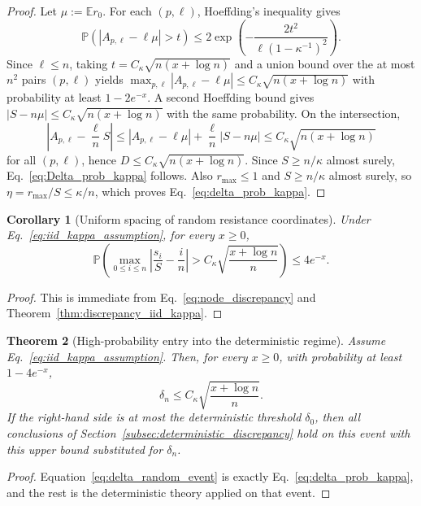 \documentclass[11pt]{article}
\numberwithin{equation}{section}
\newtheorem{theorem}{Theorem}[section]
\newtheorem{corollary}[theorem]{Corollary}
\theoremstyle{definition}
\theoremstyle{remark}
\newcommand{\E}{\mathbb{E}}
\newcommand{\Prob}{\mathbb{P}}
\begin{document}
\begin{proof}
	Let $\mu:=\E r_0$. For each $(p,\ell)$, Hoeffding's inequality gives
	\[
	\Prob\!\left(|A_{p,\ell}-\ell\mu|>t\right)
	\le
	2\exp\!\left(
	-\frac{2t^2}{\ell(1-\kappa^{-1})^2}
	\right).
	\]
	Since $\ell\le n$, taking
	$t=C_\kappa\sqrt{n(x+\log n)}$ and a union bound over the at most
	$n^2$ pairs $(p,\ell)$ yields $\max_{p,\ell}|A_{p,\ell}-\ell\mu|
	\le
	C_\kappa\sqrt{n(x+\log n)}$ with probability at least $1-2e^{-x}$. A second Hoeffding bound gives $|S-n\mu|\le C_\kappa\sqrt{n(x+\log n)}$ with the same probability. On the intersection,
	\begin{equation*}
		\left|A_{p,\ell}-\frac{\ell}{n}S\right|
		\le
		|A_{p,\ell}-\ell\mu|+\frac{\ell}{n}|S-n\mu|
		\le
		C_\kappa\sqrt{n(x+\log n)}
	\end{equation*}
	for all $(p,\ell)$, hence $D\le C_\kappa\sqrt{n(x+\log n)}$. Since $S\ge n/\kappa$ almost surely,
	Eq.~\eqref{eq:Delta_prob_kappa} follows. Also $r_{\max}\le 1$ and
	$S\ge n/\kappa$ almost surely, so $\eta=r_{\max}/S\le \kappa/n$, which
	proves Eq.~\eqref{eq:delta_prob_kappa}.
\end{proof}

\begin{corollary}[Uniform spacing of random resistance coordinates]\label{cor:grid_spacing_kappa}
	Under Eq.~\eqref{eq:iid_kappa_assumption}, for every $x\ge 0$,
	\[
	\Prob\left(
	\max_{0\le i\le n}
	\left|
	\frac{s_i}{S}-\frac{i}{n}
	\right|
	>
	C_\kappa\sqrt{\frac{x+\log n}{n}}
	\right)\le 4e^{-x}.
	\]
\end{corollary}

\begin{proof}
	This is immediate from Eq.~\eqref{eq:node_discrepancy} and
	Theorem~\ref{thm:discrepancy_iid_kappa}.
\end{proof}

\begin{theorem}[High-probability entry into the deterministic regime]\label{thm:random_to_det_transfer}
	Assume Eq.~\eqref{eq:iid_kappa_assumption}. Then, for every $x\ge 0$,
	with probability at least $1-4e^{-x}$,
	\begin{equation}\label{eq:delta_random_event}
		\delta_n\le C_\kappa\sqrt{\frac{x+\log n}{n}}.
	\end{equation}
	If the right-hand side is at most the deterministic threshold
	$\delta_0$, then all conclusions of
	Section~\ref{subsec:deterministic_discrepancy} hold on this event with
	this upper bound substituted for $\delta_n$.
\end{theorem}
\begin{proof}
	Equation~\eqref{eq:delta_random_event} is exactly
	Eq.~\eqref{eq:delta_prob_kappa}, and the rest is the deterministic theory
	applied on that event.
\end{proof}
\end{document}

